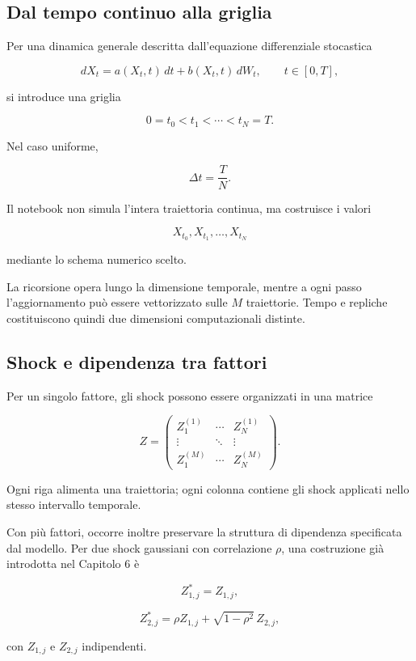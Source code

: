\subsection{Dal tempo continuo alla griglia}

Per una dinamica generale descritta dall'equazione differenziale stocastica

\[
dX_t
=
a(X_t,t)\,dt
+
b(X_t,t)\,dW_t,
\qquad
t\in[0,T],
\]

\noindent si introduce una griglia

\[
0=t_0<t_1<\cdots<t_N=T.
\]

Nel caso uniforme,

\[
\Delta t=\frac{T}{N}.
\]

Il notebook non simula l'intera traiettoria continua, ma costruisce i valori

\[
X_{t_0},X_{t_1},\ldots,X_{t_N}
\]

\noindent mediante lo schema numerico scelto.

La ricorsione opera lungo la dimensione temporale, mentre a ogni passo
l'aggiornamento pu\`o essere vettorizzato sulle \(M\) traiettorie. Tempo e
repliche costituiscono quindi due dimensioni computazionali distinte.

\subsection{Shock e dipendenza tra fattori}

Per un singolo fattore, gli shock possono essere organizzati in una matrice

\[
Z=
\begin{pmatrix}
Z_1^{(1)} & \cdots & Z_N^{(1)}\\
\vdots & \ddots & \vdots\\
Z_1^{(M)} & \cdots & Z_N^{(M)}
\end{pmatrix}.
\]

Ogni riga alimenta una traiettoria; ogni colonna contiene gli shock applicati
nello stesso intervallo temporale.

Con pi\`u fattori, occorre inoltre preservare la struttura di dipendenza
specificata dal modello. Per due shock gaussiani con correlazione \(\rho\),
una costruzione gi\`a introdotta nel Capitolo 6 \`e

\[
Z_{1,j}^{*}=Z_{1,j},
\]

\[
Z_{2,j}^{*}
=
\rho Z_{1,j}
+
\sqrt{1-\rho^2}\,Z_{2,j},
\]

con \(Z_{1,j}\) e \(Z_{2,j}\) indipendenti.

